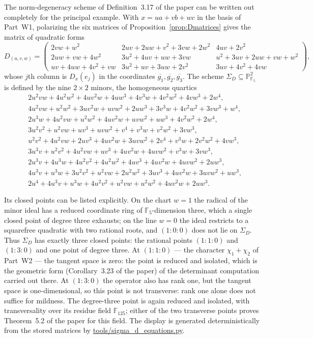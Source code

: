\documentclass[11pt]{article}
\newcommand{\Ffive}{\mathbb F_5}
\providecommand{\nolinkurl}[1]{\url{#1}}
\begin{document}
The norm-degeneracy scheme of Definition~3.17 of the paper can be
written out completely for the principal example.  With $x=ua+vb+wc$
in the basis of Part~W1, polarizing the six
matrices of Proposition~\ref{prop:Dmatrices} gives the matrix of quadratic forms
\begingroup\small
\[
  D_{(u,v,w)}=
  \begin{pmatrix}
    2vw+w^2 & 2uv+2uw+v^2+3vw+2w^2 & 4uv+2v^2\\[1pt]
    2uw+vw+4w^2 & 3u^2+4uv+uw+3vw & u^2+3uv+2uw+vw+w^2\\[1pt]
    uv+4uw+4v^2+vw & 3u^2+uv+3uw+2v^2 & 3uv+4v^2+4vw
  \end{pmatrix},
\]
\endgroup
whose $j$th column is $D_x(e_j)$ in the coordinates
$\overline{g_1},\overline{g_2},\overline{g_3}$.  The scheme
$\Sigma_D\subseteq\mathbb P^2_{\Ffive}$ is defined by the nine
$2\times2$ minors, the homogeneous quartics
\begingroup\small
\begin{align*}
 &2u^2vw+4u^2w^2+4uv^2w+4uw^3+4v^3w+4v^2w^2+4vw^3+2w^4,\\
 &4u^2vw+u^2w^2+3uv^2w+uvw^2+2uw^3+3v^3w+4v^2w^2+3vw^3+w^4,\\
 &2u^3w+4u^2vw+u^2w^2+4uv^2w+uvw^2+uw^3+4v^2w^2+2w^4,\\
 &3u^2v^2+u^2vw+uv^3+uvw^2+v^4+v^3w+v^2w^2+3vw^3,\\
 &u^2v^2+4u^2vw+2uv^3+4uv^2w+3uvw^2+2v^4+v^3w+2v^2w^2+4vw^3,\\
 &3u^3v+u^2v^2+4u^2vw+uv^3+4uv^2w+4uvw^2+v^3w+3vw^3,\\
 &2u^3v+4u^3w+4u^2v^2+4u^2w^2+4uv^3+4uv^2w+4uvw^2+2uw^3,\\
 &4u^3v+u^3w+3u^2v^2+u^2vw+2u^2w^2+3uv^3+4uv^2w+3uvw^2+uw^3,\\
 &2u^4+4u^3v+u^3w+4u^2v^2+u^2vw+u^2w^2+4uv^2w+2uw^3.
\end{align*}
\endgroup

Its closed points can be listed explicitly.  On the chart $w=1$ the
radical of the minor ideal has a reduced coordinate ring of
$\Ffive$-dimension three, which a single closed point of degree three
exhausts; on the line $w=0$ the ideal restricts to a squarefree
quadratic with two rational roots, and $(1{:}0{:}0)$ does not lie on
$\Sigma_D$.  Thus $\Sigma_D$ has exactly three closed points: the
rational points $(1{:}1{:}0)$ and $(1{:}3{:}0)$ and one point of
degree three.  At $(1{:}1{:}0)$ --- the character $\chi_1{+}\chi_2$ of
Part~W2 --- the tangent space is zero: the
point is reduced and isolated, which is the geometric form
(Corollary~3.23 of the paper) of the determinant computation
carried out there.  At $(1{:}3{:}0)$ the operator also has rank one,
but the tangent space is one-dimensional, so this point is not
transverse: rank one alone does not suffice for mildness.  The
degree-three point is again reduced and isolated, with transversality
over its residue field $\mathbb F_{125}$; either of the two
transverse points proves Theorem~5.2 of the paper for this field.  The
display is generated deterministically from the stored matrices by
\nolinkurl{tools/sigma_d_equations.py}.
\end{document}
